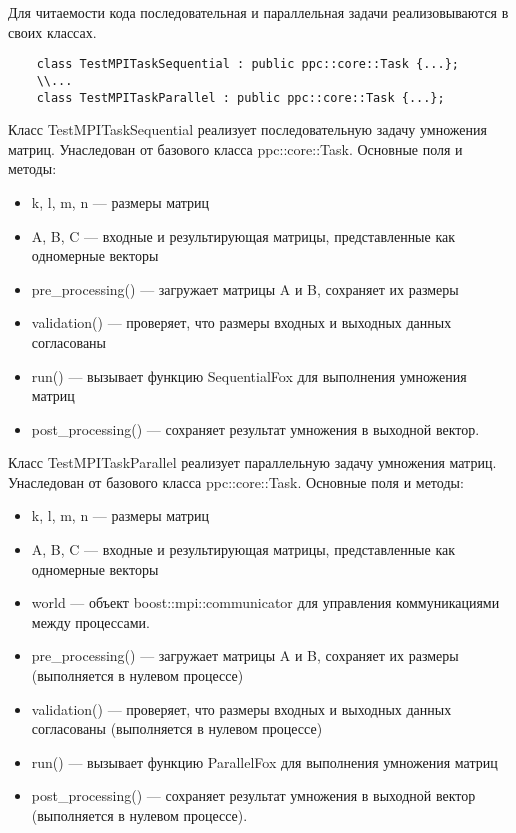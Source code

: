 \documentclass{report}
\begin{document}
Для читаемости кода последовательная и параллельная задачи реализовываются в своих классах.
\begin{lstlisting}
    class TestMPITaskSequential : public ppc::core::Task {...};
    \\...
    class TestMPITaskParallel : public ppc::core::Task {...};
\end{lstlisting}
\par Класс TestMPITaskSequential реализует последовательную задачу умножения матриц. Унаследован от базового класса ppc::core::Task. Основные поля и методы:
\begin{itemize}
    \item k, l, m, n — размеры матриц
    \item A, B, C — входные и результирующая матрицы, представленные как одномерные векторы
    \item pre\_processing() — загружает матрицы A и B, сохраняет их размеры
    \item validation() — проверяет, что размеры входных и выходных данных согласованы
    \item run() — вызывает функцию SequentialFox для выполнения умножения матриц
    \item post\_processing() — сохраняет результат умножения в выходной вектор.
\end{itemize}
\par Класс TestMPITaskParallel реализует параллельную задачу умножения матриц. Унаследован от базового класса ppc::core::Task. Основные поля и методы:
\begin{itemize}
    \item k, l, m, n — размеры матриц
    \item A, B, C — входные и результирующая матрицы, представленные как одномерные векторы
    \item world — объект boost::mpi::communicator для управления коммуникациями между процессами.
    \item pre\_processing() — загружает матрицы A и B, сохраняет их размеры (выполняется в нулевом процессе)
    \item validation() — проверяет, что размеры входных и выходных данных согласованы (выполняется в нулевом процессе)
    \item run() — вызывает функцию ParallelFox для выполнения умножения матриц
    \item post\_processing() — сохраняет результат умножения в выходной вектор (выполняется в нулевом процессе).
\end{itemize}
\end{document}
